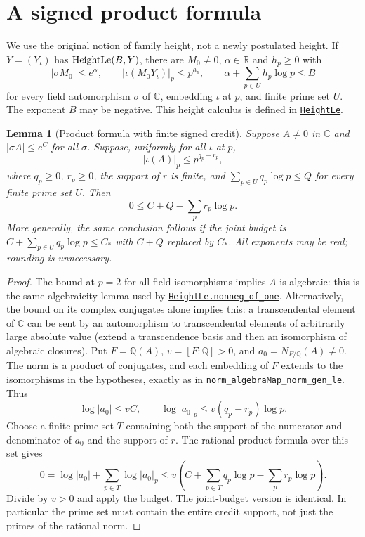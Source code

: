\documentclass[11pt,letterpaper]{article}
\newtheorem{lemma}[theorem]{Lemma}
\theoremstyle{remark}\newtheorem{remark}[theorem]{Remark}
\newcommand{\src}[3]{\href{https://github.com/VladimirReshetnikov/ProveIt/blob/89d12dd40424f1217fd818d84877b3da52396a3b/Analysis/GeneralizedRiemannHypothesis/Lean/grh/src/#1.lean\#L#2}{\texttt{#3}}}
\begin{document}
\section{A signed product formula}\label{sec:signed}
We use the original notion of family height, not a newly postulated height. If $Y=(Y_\iota)$ has $\operatorname{HeightLe}(B,Y)$, there are $M_0\ne0$, $\alpha\in\mathbb R$ and $h_p\ge0$ with
\[
 |\sigma M_0|\le e^\alpha,\qquad |\iota(M_0Y_\iota)|_p\le p^{h_p},\qquad
 \alpha+\sum_{p\in U}h_p\log p\le B
\]
for every field automorphism $\sigma$ of $\mathbb C$, embedding $\iota$ at $p$, and finite prime set $U$. The exponent $B$ may be negative. This height calculus is defined in \src{New/Reduction/Lattices/Heights}{35}{HeightLe}.

\begin{lemma}[Product formula with finite signed credit]\label{lem:signed}
Suppose $A\ne0$ in $\mathbb C$ and $|\sigma A|\le e^C$ for all $\sigma$. Suppose, uniformly for all $\iota$ at $p$,
\[
 |\iota(A)|_p\le p^{q_p-r_p},
\]
where $q_p\ge0$, $r_p\ge0$, the support of $r$ is finite, and $\sum_{p\in U}q_p\log p\le Q$ for every finite prime set $U$. Then
\begin{equation}\label{eq:sgn}
 0\le C+Q-\sum_p r_p\log p.
\end{equation}
More generally, the same conclusion follows if the joint budget is $C+\sum_{p\in U}q_p\log p\le C_*$ with $C+Q$ replaced by $C_*$. All exponents may be real; rounding is unnecessary.
\end{lemma}
\begin{proof}
The bound at $p=2$ for all field isomorphisms implies $A$ is algebraic: this is the same algebraicity lemma used by \src{New/Reduction/Lattices/Heights}{191}{HeightLe.nonneg\_of\_one}. Alternatively, the bound on its complex conjugates alone implies this: a transcendental element of $\mathbb C$ can be sent by an automorphism to transcendental elements of arbitrarily large absolute value (extend a transcendence basis and then an isomorphism of algebraic closures). Put $F=\mathbb Q(A)$, $v=[F:\mathbb Q]>0$, and $a_0=N_{F/\mathbb Q}(A)\ne0$. The norm is a product of conjugates, and each embedding of $F$ extends to the isomorphisms in the hypotheses, exactly as in \src{New/Reduction/Lattices/Heights}{175}{norm\_algebraMap\_norm\_gen\_le}. Thus
\[
 \log|a_0|\le v C,\qquad \log|a_0|_p\le v(q_p-r_p)\log p.
\]
Choose a finite prime set $T$ containing both the support of the numerator and denominator of $a_0$ and the support of $r$. The rational product formula over this set gives
\[
 0=\log|a_0|+\sum_{p\in T}\log|a_0|_p
 \le v\left(C+\sum_{p\in T}q_p\log p-\sum_p r_p\log p\right).
\]
Divide by $v>0$ and apply the budget. The joint-budget version is identical. In particular the prime set must contain the entire credit support, not just the primes of the rational norm.
\end{proof}
\end{document}

